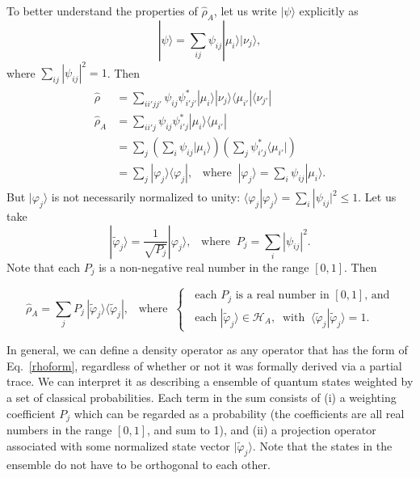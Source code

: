 \documentclass[pra,12pt]{revtex4}
\begin{document}
To better understand the properties of $\hat{\rho}_A$, let us write
$|\psi\rangle$ explicitly as
\begin{equation}
  |\psi\rangle = \sum_{ij} \psi_{ij} |\mu_i\rangle |\nu_j\rangle,
\end{equation}
where $\sum_{ij} |\psi_{ij}|^2 = 1$.  Then
\begin{align}
  \begin{aligned}
    \hat{\rho} &= \sum_{ii'jj'} \psi_{ij}\psi_{i'j'}^* |\mu_i\rangle |\nu_j\rangle
    \langle\mu_{i'}|\langle \nu_{j'}| \\
    \hat{\rho}_A &= \sum_{ii'j} \psi_{ij}\psi_{i'j}^* |\mu_i\rangle
    \langle\mu_{i'}| \\
    &= \sum_j \left(\sum_i \psi_{ij} |\mu_i\rangle\right)\left(\sum_j
    \psi_{i'j}^*\langle\mu_{i'}|\right) \\
    &= \sum_j |\varphi_j\rangle \langle \varphi_j|, \;\;\;\mathrm{where}
    \;\; |\varphi_j\rangle = \sum_i \psi_{ij} |\mu_i\rangle.
  \end{aligned}
\end{align}
But $|\varphi_j\rangle$ is not necessarily normalized to unity:
$\langle \varphi_j | \varphi_j\rangle = \sum_{i}|\psi_{ij}|^2 \le 1$.
Let us take
\begin{equation}
  |\tilde{\varphi}_j\rangle = \frac{1}{\sqrt{P_j}} |\varphi_j\rangle,
  \;\;\;\mathrm{where} \;\; P_j = \sum_{i}|\psi_{ij}|^2.
\end{equation}
Note that each $P_j$ is a non-negative real number in the range
$[0,1]$.  Then
\begin{framed}
\begin{equation}
  \hat{\rho}_A = \sum_j P_j\, |\tilde{\varphi}_j\rangle
  \langle \tilde{\varphi}_j|,
  \;\;\;\mathrm{where}\;\;
  \begin{cases}
    \;\;\textrm{each $P_j$ is a real number in $[0,1]$, and} \\
    \;\;\textrm{each}\; |\tilde{\varphi}_j\rangle \in \mathscr{H}_A,
    \;\;\mathrm{with}
    \;\;\langle\tilde{\varphi}_j|\tilde{\varphi}_j\rangle = 1.
  \end{cases}
  \label{rhoform}
\end{equation}
\end{framed}

In general, we can define a density operator as any operator that has
the form of Eq.~\eqref{rhoform}, regardless of whether or not it was
formally derived via a partial trace.  We can interpret it as
describing a ensemble of quantum states weighted by a set of classical
probabilities.  Each term in the sum consists of (i) a weighting
coefficient $P_j$ which can be regarded as a probability (the
coefficients are all real numbers in the range $[0,1]$, and sum to 1),
and (ii) a projection operator associated with some normalized state
vector $|\tilde{\varphi}_j\rangle$.  Note that the states in the
ensemble do not have to be orthogonal to each other.
\end{document}
